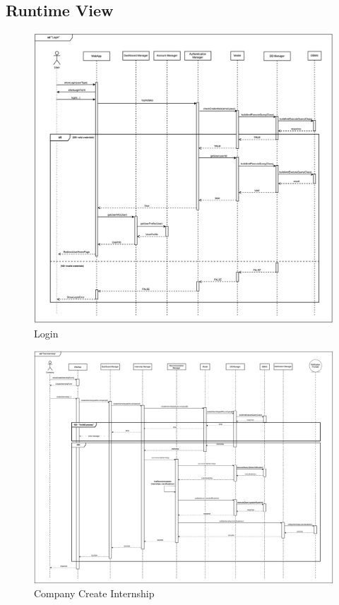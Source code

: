 \documentclass[a4paper,12pt]{article}
\begin{document}
\subsection{Runtime View}
\begin{figure}[H]
    \centering
    \includegraphics[scale = 0.35]{DD_figures/SingleDiagrams/login.drawio.png}
    \caption{Login}
    \centering
\end{figure}

\begin{figure}[H]
    \centering
    \includegraphics[scale = 0.25]{DD_figures/SingleDiagrams/postInternship.drawio.png}
    \caption{Company Create Internship}
    \centering
\end{figure}
\end{document}
